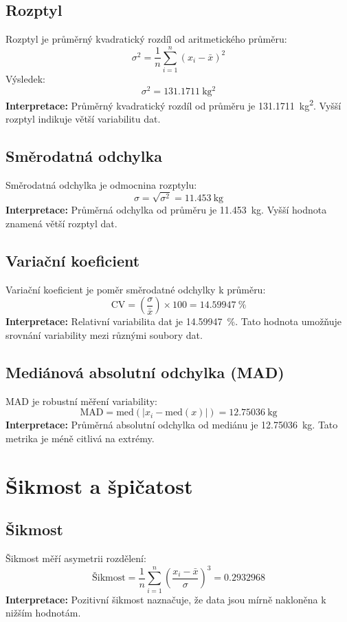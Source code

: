 \documentclass{article}
\begin{document}
\subsection{Rozptyl}
Rozptyl je průměrný kvadratický rozdíl od aritmetického průměru:
\[
\sigma^2 = \frac{1}{n} \sum_{i=1}^{n} (x_i - \bar{x})^2
\]
Výsledek:
\[
\sigma^2 = \SI{131.1711}{\kilo\gram^2}
\]
\textbf{Interpretace:} Průměrný kvadratický rozdíl od průměru je \SI{131.1711}{\kilo\gram^2}. Vyšší rozptyl indikuje větší variabilitu dat.

\subsection{Směrodatná odchylka}
Směrodatná odchylka je odmocnina rozptylu:
\[
\sigma = \sqrt{\sigma^2} = \SI{11.453}{\kilo\gram}
\]
\textbf{Interpretace:} Průměrná odchylka od průměru je \SI{11.453}{\kilo\gram}. Vyšší hodnota znamená větší rozptyl dat.

\subsection{Variační koeficient}
Variační koeficient je poměr směrodatné odchylky k průměru:
\[
\text{CV} = \left( \frac{\sigma}{\bar{x}} \right) \times 100 = \SI{14.59947}{\percent}
\]
\textbf{Interpretace:} Relativní variabilita dat je \SI{14.59947}{\percent}. Tato hodnota umožňuje srovnání variability mezi různými soubory dat.

\subsection{Mediánová absolutní odchylka (MAD)}
MAD je robustní měření variability:
\[
\text{MAD} = \text{med}(|x_i - \text{med}(x)|) = \SI{12.75036}{\kilo\gram}
\]
\textbf{Interpretace:} Průměrná absolutní odchylka od mediánu je \SI{12.75036}{\kilo\gram}. Tato metrika je méně citlivá na extrémy.

\section{Šikmost a špičatost}

\subsection{Šikmost}
Šikmost měří asymetrii rozdělení:
\[
\text{Šikmost} = \frac{1}{n} \sum_{i=1}^{n} \left( \frac{x_i - \bar{x}}{\sigma} \right)^3 = 0.2932968
\]
\textbf{Interpretace:} Pozitivní šikmost naznačuje, že data jsou mírně nakloněna k nižším hodnotám.
\end{document}
